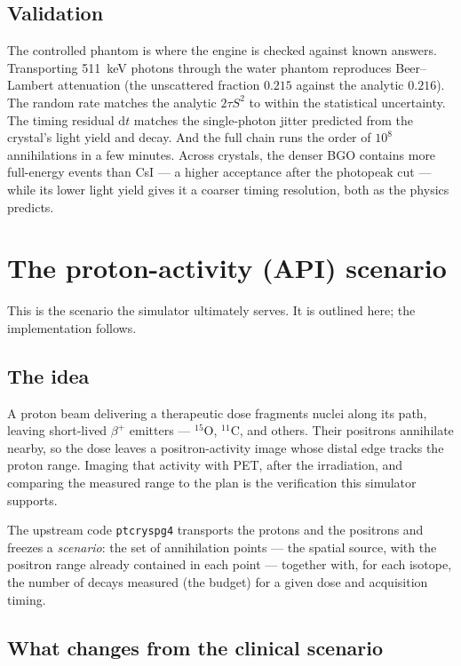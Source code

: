 \documentclass[11pt]{article}
\begin{document}
\subsection{Validation}

The controlled phantom is where the engine is checked against known answers. Transporting
\SI{511}{keV} photons through the water phantom reproduces Beer--Lambert attenuation (the unscattered
fraction $0.215$ against the analytic $0.216$). The random rate matches the analytic $2\tau S^2$ to
within the statistical uncertainty. The timing residual $\mathrm{d}t$ matches the single-photon
jitter predicted from the crystal's light yield and decay. And the full chain runs the order of
$10^{8}$ annihilations in a few minutes. Across crystals, the denser BGO contains more full-energy
events than CsI --- a higher acceptance after the photopeak cut --- while its lower light yield gives
it a coarser timing resolution, both as the physics predicts.

\section{The proton-activity (API) scenario}
\label{sec:api}

This is the scenario the simulator ultimately serves. It is outlined here; the implementation
follows.

\subsection{The idea}

A proton beam delivering a therapeutic dose fragments nuclei along its path, leaving short-lived
$\beta^+$ emitters --- $^{15}$O, $^{11}$C, and others. Their positrons annihilate nearby, so the dose
leaves a positron-activity image whose distal edge tracks the proton range. Imaging that activity with
PET, after the irradiation, and comparing the measured range to the plan is the verification this
simulator supports.

The upstream code \texttt{ptcryspg4} transports the protons and the positrons and freezes a
\emph{scenario}: the set of annihilation points --- the spatial source, with the positron range
already contained in each point --- together with, for each isotope, the number of decays measured
(the budget) for a given dose and acquisition timing.

\subsection{What changes from the clinical scenario}
\end{document}
